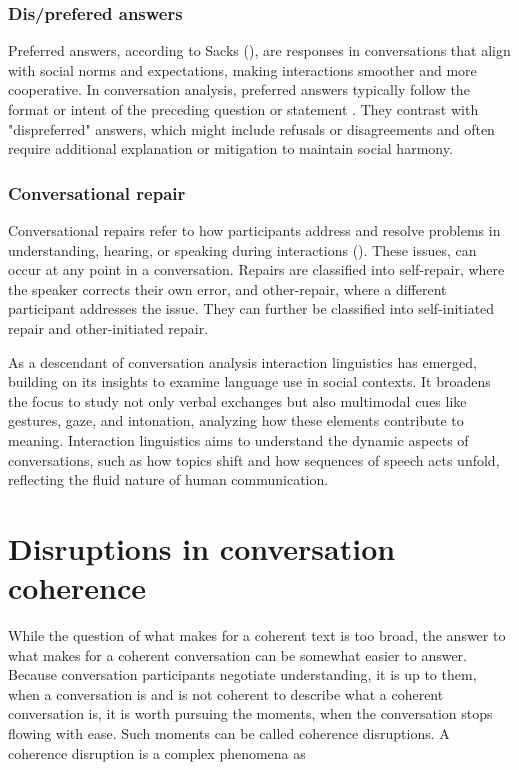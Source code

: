 \documentclass[12pt]{report}
\begin{document}
{    \subsubsection{Dis/prefered answers}
    \par
    Preferred answers, according to Sacks (), are responses in conversations that align with social norms and expectations, making interactions smoother and more cooperative. In conversation analysis, preferred answers typically follow the format or intent of the preceding question or statement . They contrast with "dispreferred" answers, which might include refusals or disagreements and often require additional explanation or mitigation to maintain social harmony.

    \subsubsection{Conversational repair}
    \par
    Conversational repairs refer to how participants address and resolve problems in understanding, hearing, or speaking during interactions (). These issues, can occur at any point in a conversation. Repairs are classified into self-repair, where the speaker corrects their own error, and other-repair, where a different participant addresses the issue. They can further be classified into self-initiated repair and other-initiated repair.

\par
As a descendant of conversation analysis interaction linguistics has emerged,
building on its insights to examine language use in social contexts.
It broadens the focus to study not only verbal exchanges but also
multimodal cues like gestures, gaze, and intonation,
analyzing how these elements contribute to meaning.
Interaction linguistics aims to understand the dynamic aspects of conversations,
such as how topics shift and how sequences of speech acts unfold,
reflecting the fluid nature of human communication.

\section{Disruptions in conversation coherence}
\par
While the question of what makes for a coherent text is too broad,
the answer to what makes for a coherent conversation can be somewhat easier to answer.
Because conversation participants negotiate understanding,
it is up to them, when a conversation is and is not coherent
to describe what a coherent conversation is,
it is worth pursuing the moments, when the conversation stops flowing with ease.
Such moments can be called coherence disruptions.
A coherence disruption is a complex phenomena as

}
\end{document}
